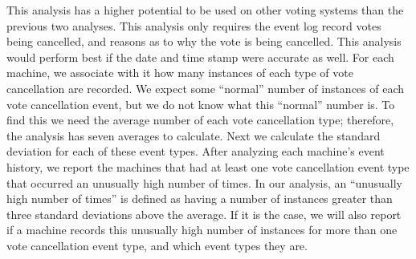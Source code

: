 This analysis has a higher potential to be used on other voting systems than the previous two analyses.  This analysis only requires the event log record votes being cancelled, and reasons as to why the vote is being cancelled.  This analysis would perform best if the date and time stamp were accurate as well.  For each machine, we associate with it how many instances of each type of vote cancellation are recorded.  We expect some \textquotedblleft normal\textquotedblright \hspace{1 mm} number of instances of each vote cancellation event, but we do not know what this \textquotedblleft normal\textquotedblright \hspace{1 mm} number is.  To find this we need the average number of each vote cancellation type; therefore, the analysis has seven averages to calculate.  Next we calculate the standard deviation for each of these event types.  After analyzing each machine’s event history, we report the machines that had at least one vote cancellation event type that occurred an unusually high number of times. In our analysis, an \textquotedblleft unusually high number of times\textquotedblright \hspace{1 mm} is defined as having a number of instances greater than three standard deviations above the average.  If it is the case, we will also report if a machine records this unusually high number of instances for more than one vote cancellation event type, and which event types they are.  

